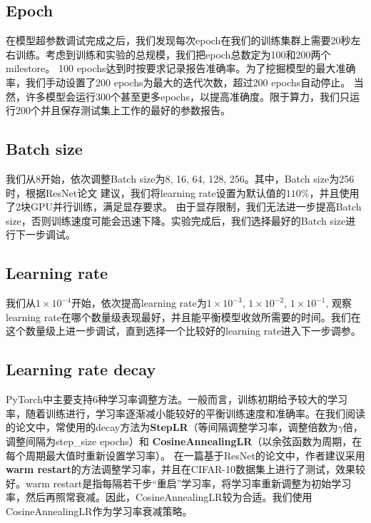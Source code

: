 \documentclass{article}
\theoremstyle{definition}
\begin{document}
\subsection{Epoch}
在模型超参数调试完成之后，我们发现每次epoch在我们的训练集群上需要20秒左右训练。考虑到训练和实验的总规模，我们把epoch总数定为100和200两个milestore。 100 epochs达到时按要求记录报告准确率。为了挖掘模型的最大准确率，我们手动设置了200 epochs为最大的迭代次数，超过200 epochs自动停止。
当然，许多模型会运行300个甚至更多epochs，以提高准确度。\cite{xie2017aggregated}限于算力，我们只运行200个并且保存测试集上工作的最好的参数报告。

\subsection{Batch size}
我们从8开始，依次调整Batch size为8, 16, 64, 128, 256。其中，Batch size为256时，根据ResNet论文\cite{he2015deep} 建议，我们将learning rate设置为默认值的$110\%$，并且使用了2块GPU并行训练，满足显存要求。
由于显存限制，我们无法进一步提高Batch size，否则训练速度可能会迅速下降。实验完成后，我们选择最好的Batch size进行下一步调试。

\subsection{Learning rate}
我们从$1 \times 10^{-4}$开始，依次提高learning rate为$1 \times 10^{-3}$, $1 \times 10^{-2}$, $1 \times 10^{-1}$, 观察learning rate在哪个数量级表现最好，并且能平衡模型收敛所需要的时间。我们在这个数量级上进一步调试，直到选择一个比较好的learning rate进入下一步调参。

\subsection{Learning rate decay}
PyTorch中主要支持6种学习率调整方法。一般而言，训练初期给予较大的学习率，随着训练进行，学习率逐渐减小能较好的平衡训练速度和准确率。在我们阅读的论文中，常使用的decay方法为\textbf{StepLR}（等间隔调整学习率，调整倍数为$\gamma$倍，调整间隔为step\_size epochs）和 \textbf{CosineAnnealingLR}（以余弦函数为周期，在每个周期最大值时重新设置学习率）。
在一篇基于ResNet的论文中\cite{loshchilov2017sgdr}，作者建议采用\textbf{warm restart}的方法调整学习率，并且在CIFAR-10数据集上进行了测试，效果较好。warm restart是指每隔若干步“重启”学习率，将学习率重新调整为初始学习率，然后再照常衰减。因此，CosineAnnealingLR较为合适。我们使用CosineAnnealingLR作为学习率衰减策略。
\end{document}
